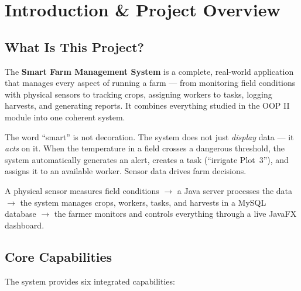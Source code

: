 \documentclass[12pt, a4paper]{report}
\begin{document}
\chapter{Introduction \& Project Overview}

\section{What Is This Project?}

The \textbf{Smart Farm Management System} is a complete, real-world application that manages every aspect of running a farm --- from monitoring field conditions with physical sensors to tracking crops, assigning workers to tasks, logging harvests, and generating reports. It combines everything studied in the OOP II module into one coherent system.

The word ``smart'' is not decoration. The system does not just \emph{display} data --- it \emph{acts} on it. When the temperature in a field crosses a dangerous threshold, the system automatically generates an alert, creates a task (``irrigate Plot~3''), and assigns it to an available worker. Sensor data drives farm decisions.

\begin{tcolorbox}[notebox, title={The System in One Sentence}]
A physical sensor measures field conditions $\rightarrow$ a Java server processes the data $\rightarrow$ the system manages crops, workers, tasks, and harvests in a MySQL database $\rightarrow$ the farmer monitors and controls everything through a live JavaFX dashboard.
\end{tcolorbox}

\section{Core Capabilities}

The system provides six integrated capabilities:
\end{document}
